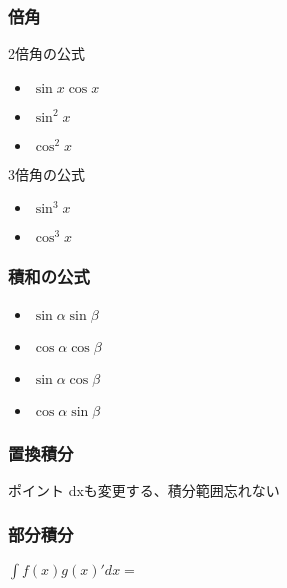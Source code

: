 \documentclass[10pt,dvipdfmx]{jsarticle}
\newcommand{\answer}[2]{{\color{orange}#2}}
\newcommand{\answer}[2]{\vspace{#1mm}}
\begin{document}
\subsubsection*{倍角}
\begin{multicols}{2}
  2倍角の公式
  \begin{Large}
    \begin{itemize}
      \item $\sin x\cos x$
      \item $\sin^2 x$
      \item $\cos^2 x$
    \end{itemize}
  \end{Large}

  3倍角の公式
  \begin{Large}
    \begin{itemize}
      \item $\sin^3 x$
      \item $\cos^3 x$
    \end{itemize}
  \end{Large}
\end{multicols}

\subsubsection*{積和の公式}
\begin{multicols}{2}
  \begin{Large}
    \begin{itemize}
      \item $\sin \alpha\sin \beta$
      \item $\cos \alpha\cos \beta$
      \item $\sin \alpha\cos \beta$
      \item $\cos \alpha\sin \beta$
    \end{itemize}
  \end{Large}
\end{multicols}

\subsubsection*{置換積分}
\begin{itembox}[l]{ポイント}
  \answer{15}{dxも変更する、積分範囲忘れない}
\end{itembox}

\subsubsection*{部分積分}
\begin{Large}
  $\int f(x)g(x)' dx=$
\end{Large}
\end{document}

